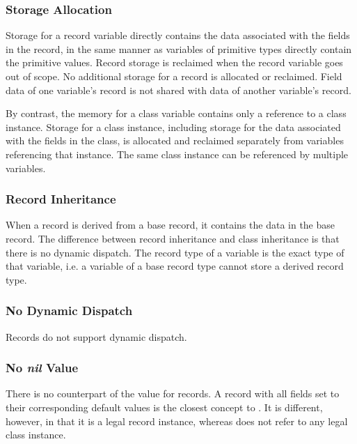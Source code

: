 \subsubsection{Storage Allocation}
\label{Record_Storage}

Storage for a record variable directly contains the data associated
with the fields in the record, in the same manner as variables
of primitive types directly contain the primitive values.
Record storage is reclaimed when the record variable goes out of scope.
No additional storage for a record is allocated or reclaimed.
Field data of one variable's record is not shared with data
of another variable's record.

By contrast, the memory for a class variable contains only a reference to a
class instance.  Storage for a class instance, including storage for
the data associated with the fields in the class, is allocated and reclaimed
separately from variables referencing that instance.  The same class instance
can be referenced by multiple variables.

\subsubsection{Record Inheritance}
\label{Record_Inheritance}

When a record is derived from a base record, it contains the data in
the base record.  The difference between record inheritance and class
inheritance is that there is no dynamic dispatch.  The record type of
a variable is the exact type of that variable, i.e. a variable of a
base record type cannot store a derived record type.

\subsubsection{No Dynamic Dispatch}

Records do not support dynamic dispatch.

\subsubsection{No {\em nil} Value}

There is no counterpart of the  value for records.  A record
with all fields set to their corresponding default values is the
closest concept to . It is different, however, in that it is
a legal record instance, whereas  does not refer to any
legal class instance.

